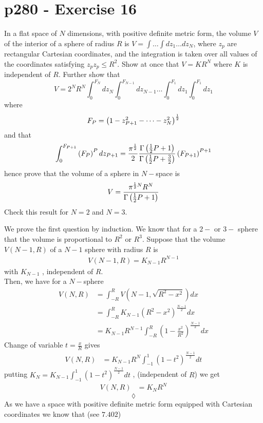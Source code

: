 \section{p280 - Exercise 16}
\begin{tcolorbox}
In a flat space of $N$ dimensions, with positive definite metric form, the volume $V$ of the interior of a sphere of radius $R$ is $V=\int \dots \int dz_1 \dots dz_N$, where $z_p$ are rectangular Cartesian coordinates, and the integration is taken over all values of the coordinates satisfying $z_pz_p \leq R^2$. Show at once that $V= KR^N$ where $K$ is independent of $R$. Further show that
$$V=2^N R^N\int_0^{F_N} dz_N\int_0^{F_{N-1}} dz_{N-1} \dots \int_0^{F_1} dz_1\int_0^{F_1} dz_1$$
where 
$$F_P=\left(1-z_{P+1}^2-\dots - z_N^2\right)^{\frac{1}{2}}$$
and that
$$\int_0^{F_{P+1}} \left(F_P\right)^P dz_{P+1}=\frac{\pi^{\frac{1}{2}}}{2}\frac{\Gamma\left(\frac{1}{2} P+1\right)}{\Gamma\left(\frac{1}{2} P+\frac{3}{2}\right)}\left(F_{P+1}\right)^{P+1}$$ hence prove that the volume of a sphere in $N-$space is 
$$V=\frac{\pi^{\frac{1}{2} N} R^N}{\Gamma\left(\frac{1}{2} P+1\right)}$$
Check this result for $N=2$ and $N=3$.
\end{tcolorbox}
We prove the first question by induction.
We know that for a $2-$ or $3-$ sphere that the volume is proportional to $R^2$ or $R^3$.
Suppose that the volume $V(N-1, R)$ of a $N-1$ sphere with radius $R$ is 
\begin{align}
V(N-1, R) =  K_{N-1}R^{N-1}
\end{align}
with $K_{N-1}$ , independent of $R$.\\
Then, we have for a $N-$sphere
\begin{align}
V(N, R) &=  \int_{-R}^{R} V\left(N-1, \sqrt{R^2-x^2}\right)dx\\
&=  \int_{-R}^{R} K_{N-1}\left(R^2-x^2\right)^\frac{N-1}{2}dx\\
&=  K_{N-1}R^{N-1}\int_{-R}^{R} \left(1-\frac{x^2}{R^2}\right)^\frac{N-1}{2}dx
\end{align}
Change of variable $t=\frac{x}{R}$ gives  
\begin{align}
V(N, R) &=K_{N-1}R^{N}\int_{-1}^{1} \left(1-t^2\right)^\frac{N-1}{2}dt
\end{align}
putting $K_{N}=K_{N-1}\int_{-1}^{1} \left(1-t^2\right)^\frac{N-1}{2}dt$ , (independent of $R$) we get 
\begin{align}
V(N, R) &=K_{N}R^{N}
\end{align}
$$\lozenge$$
As we have a space with positive definite metric form equipped with Cartesian coordinates we know that (see $\mathbf{7.402}$)
